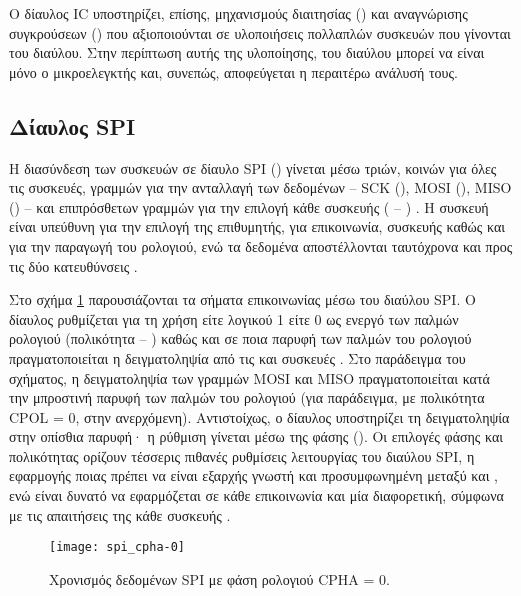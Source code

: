Ο δίαυλος IC υποστηρίζει, επίσης, μηχανισμούς διαιτησίας
() και αναγνώρισης συγκρούσεων () που
αξιοποιούνται σε υλοποιήσεις πολλαπλών συσκευών που γίνονται  του
διαύλου. Στην περίπτωση αυτής της υλοποίησης,  του διαύλου μπορεί να
είναι μόνο ο μικροελεγκτής και, συνεπώς, αποφεύγεται η περαιτέρω ανάλυσή τους.

\subsection{Δίαυλος SPI}
\label{subsec:spi}

Η διασύνδεση των συσκευών σε δίαυλο SPI ()
γίνεται μέσω τριών, κοινών για όλες τις συσκευές, γραμμών για την ανταλλαγή των
δεδομένων -- SCK (), MOSI (), MISO
() -- και επιπρόσθετων γραμμών για την επιλογή κάθε
 συσκευής ( -- )
\parencite[15,24]{motorola04}. Η  συσκευή είναι υπεύθυνη για την
επιλογή της επιθυμητής, για επικοινωνία,  συσκευής καθώς και για την
παραγωγή του ρολογιού, ενώ τα δεδομένα αποστέλλονται ταυτόχρονα και προς τις δύο
κατευθύνσεις \parencite[26--27]{motorola04}.

Στο σχήμα \ref{fig:spi:cpha-0} παρουσιάζονται τα σήματα επικοινωνίας μέσω του
διαύλου SPI. Ο δίαυλος ρυθμίζεται για τη χρήση είτε λογικού 1 είτε 0 ως ενεργό
 των παλμών ρολογιού (πολικότητα -- ) καθώς και σε ποια
παρυφή των παλμών του ρολογιού πραγματοποιείται η δειγματοληψία από τις
 και  συσκευές \parencite[27--28]{motorola04}. Στο
παράδειγμα του σχήματος, η δειγματοληψία των γραμμών MOSI και MISO
πραγματοποιείται κατά την μπροστινή παρυφή των παλμών του ρολογιού (για
παράδειγμα, με πολικότητα CPOL = 0, στην ανερχόμενη). Αντιστοίχως, ο δίαυλος
υποστηρίζει τη δειγματοληψία στην οπίσθια παρυφή· η ρύθμιση γίνεται μέσω της
φάσης (). Οι επιλογές φάσης και πολικότητας ορίζουν τέσσερις
πιθανές ρυθμίσεις λειτουργίας του διαύλου SPI, η εφαρμογής ποιας πρέπει να είναι
εξαρχής γνωστή και προσυμφωνημένη μεταξύ  και , ενώ είναι
δυνατό να εφαρμόζεται σε κάθε επικοινωνία και μία διαφορετική, σύμφωνα με τις
απαιτήσεις της κάθε συσκευής \parencites[27]{motorola04}[167]{atmel13}.

\begin{figure}
    \caption{Χρονισμός δεδομένων SPI με φάση ρολογιού CPHA = 0.
    \label{fig:spi:cpha-0}}
    \begin{center}
    \texttt{[image: spi\_cpha-0]}
    \end{center}
\end{figure}

